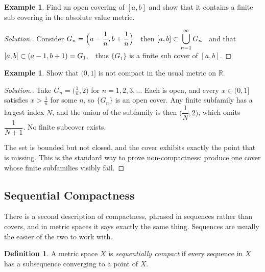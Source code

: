 \documentclass[11pt,a4paper]{article}
\theoremstyle{definition}
\newtheorem{defn}[thm]{Definition}
\newtheorem{exa}[thm]{Example}
\newenvironment{solution}
  {\renewcommand{\qedsymbol}{}\begin{proof}[\textit{Solution}.]}
  {\end{proof}}
\begin{document}
\begin{exa}
Find an open covering of $[a,b]$ and show that it contains a finite sub covering
in the absolute value metric.
\end{exa}

\begin{solution}
Consider \hspace{0.2cm}$G_n=\Big(a-\dfrac{1}{n},b+\dfrac{1}{n}\Big)\hspace{0.2cm}$
then \hspace{0.2cm}$\displaystyle{[a,b]\subset \bigcup^{\infty}_{n=1}G_n}\hspace{0.2cm}$
and that \hspace{0.2cm}$[a,b]\subset (a-1,b+1)=G_1,\hspace{0.2cm}$ thus
$\{G_1\}$ is a finite sub cover of $[a,b]$.
\end{solution}

\begin{exa}
Show that $(0,1]$ is not compact in the usual metric on $\mathbb{R}$.
\end{exa}

\begin{solution}
Take $\displaystyle{G_n = \Big(\frac1n , 2\Big)}$ for $n=1,2,3,\dots$ Each is
open, and every $x\in(0,1]$ satisfies $x>\frac1n$ for some $n$, so
$\{G_n\}$ is an open cover. Any finite subfamily has a largest index $N$, and
the union of the subfamily is then $\Big(\dfrac1N,2\Big)$, which omits
$\dfrac{1}{N+1}$. No finite subcover exists.

The set is bounded but not closed, and the cover exhibits exactly the point that
is missing. This is the standard way to prove non-compactness: produce one cover
whose finite subfamilies visibly fail.
\end{solution}

\pagebreak

\subsection{Sequential Compactness}

There is a second description of compactness, phrased in sequences rather than
covers, and in metric spaces it says exactly the same thing. Sequences are
usually the easier of the two to work with.

\begin{defn}
A metric space $X$ is \emph{sequentially compact} if every sequence in $X$ has a
subsequence converging to a point of $X$.
\end{defn}
\end{document}
